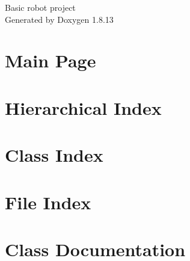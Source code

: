 \documentclass[twoside]{book}
\newcommand{\+}{\discretionary{\mbox{\scriptsize$\hookleftarrow$}}{}{}}
\newcommand{\clearemptydoublepage}{%
  \newpage{\pagestyle{empty}\cleardoublepage}%
}
\begin{document}
\hypersetup{pageanchor=false,
             bookmarksnumbered=true,
             pdfencoding=unicode
            }
\begin{titlepage}
\vspace*{7cm}
\begin{center}%
{\Large Basic robot project }\\
\vspace*{1cm}
{\large Generated by Doxygen 1.8.13}\\
\end{center}
\end{titlepage}
\clearemptydoublepage
{}
\tableofcontents
\clearemptydoublepage
{}
\hypersetup{pageanchor=true}

\chapter{Main Page}
\label{index}\hypertarget{index}{}
\chapter{Hierarchical Index}

\chapter{Class Index}

\chapter{File Index}

\chapter{Class Documentation}




























\end{document}
